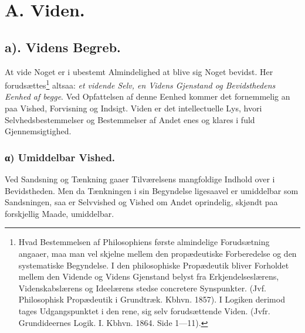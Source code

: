 \documentclass[12pt]{book}
\newcommand{\opage}[1]{\marginnote{\footnotesize\textit{[#1]}}}
\begin{document}

\mainmatter

\chapter*{A. Viden.}
\opage{1} %
\section*{a). Videns Begreb.}

At vide Noget er i ubestemt Almindelighed at blive sig
Noget bevidst. Her forudsættes\footnote{Hvad Bestemmelsen af
Philosophiens første almindelige Forudsætning angaaer, maa man vel
skjelne mellem den propædeutiske Forberedelse og den systematiske
Begyndelse. I den philosophiske Propædeutik bliver Forholdet mellem
den Vidende og Videns Gjenstand belyst fra Erkjendelseslærens,
Videnskabslærens og Ideelærens stedse concretere Synspunkter.
(Jvf. Philosophisk Propædeutik i Grundtræk. Kbhvn. 1857). I Logiken
derimod tages Udgangspunktet i den rene, sig selv forudsættende
Viden. (Jvfr. Grundideernes Logik. I. Kbhvn. 1864. Side 1---11).}
altsaa: \emph{et vidende Selv, en Videns Gjenstand og Bevidsthedens
Eenhed af begge}. Ved Opfattelsen af denne Eenhed kommer det
fornemmelig an paa Vished, Forvisning og Indsigt. Viden er det
intellectuelle Lys, hvori Selvhedsbestemmelser og Bestemmelser af
Andet enes og klares i fuld Gjennemsigtighed.

\subsection*{α) Umiddelbar Vished.}

Ved Sandsning og Tænkning gaaer Tilværelsens mangfoldige Indhold
over i Bevidstheden. Men da Tænkningen i sin Begyndelse ligesaavel
\opage{2} er umiddelbar som Sandsningen, saa er Selvvished og Vished om Andet
oprindelig, skjøndt paa forskjellig Maade, umiddelbar.
\end{document}
